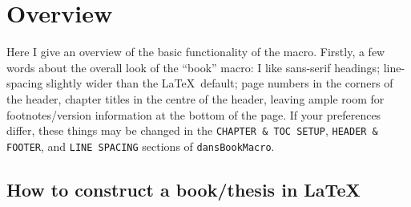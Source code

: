\chapter{Overview}\label{ch:intro}

Here I give an overview of the basic functionality of the macro.
Firstly, a few words about the overall look of the ``book'' macro: I like sans-serif headings; line-spacing slightly wider than the \LaTeX\ default; page numbers in the corners of the header, chapter titles in the centre of the header, leaving ample room for footnotes/version information at the bottom of the page.
If your preferences differ, these things may be changed in the \texttt{CHAPTER \& TOC SETUP}, \texttt{HEADER \& FOOTER}, and \texttt{LINE SPACING} sections of \texttt{dansBookMacro}.

\section{How to construct a book/thesis in \LaTeX}

